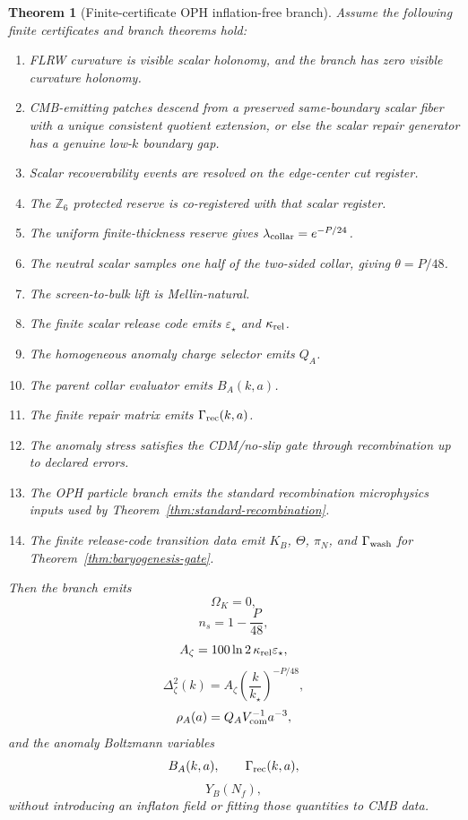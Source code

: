 \documentclass[11pt]{article}
\newtheorem{theorem}{Theorem}[section]
\newcommand{\Zsix}{\mathbb Z_6}
\begin{document}
\begin{theorem}[Finite-certificate OPH inflation-free branch]\label{thm:finite-certificate-branch}
Assume the following finite certificates and branch theorems hold:
\begin{enumerate}[leftmargin=2em]
\item FLRW curvature is visible scalar holonomy, and the branch has zero visible curvature holonomy.
\item CMB-emitting patches descend from a preserved same-boundary scalar fiber with a unique
consistent quotient extension, or else the scalar repair generator has a genuine low-\(k\) boundary
gap.
\item Scalar recoverability events are resolved on the edge-center cut register.
\item The \(\Zsix\) protected reserve is co-registered with that scalar register.
\item The uniform finite-thickness reserve gives \(\lambda_{\rm collar}=e^{-P/24}\).
\item The neutral scalar samples one half of the two-sided collar, giving \(\theta=P/48\).
\item The screen-to-bulk lift is Mellin-natural.
\item The finite scalar release code emits \(\varepsilon_\star\) and \(\kappa_{\rm rel}\).
\item The homogeneous anomaly charge selector emits \(Q_A\).
\item The parent collar evaluator emits \(B_A(k,a)\).
\item The finite repair matrix emits \(\Gamma_{\rm rec}(k,a)\).
\item The anomaly stress satisfies the CDM/no-slip gate through recombination up to declared errors.
\item The OPH particle branch emits the standard recombination microphysics inputs used by
Theorem~\ref{thm:standard-recombination}.
\item The finite release-code transition data emit \(K_B\), \(\Theta\), \(\pi_N\), and
\(\Gamma_{\rm wash}\) for Theorem~\ref{thm:baryogenesis-gate}.
\end{enumerate}
Then the branch emits
\[
\Omega_K=0,
\]
\[
n_s=1-\frac{P}{48},
\]
\[
A_\zeta
=
100\ln2\,\kappa_{\rm rel}\varepsilon_\star,
\]
\[
\Delta_\zeta^2(k)
=
A_\zeta
\left(\frac{k}{k_\star}\right)^{-P/48},
\]
\[
\rho_A(a)=Q_AV_{\rm com}^{-1}a^{-3},
\]
and the anomaly Boltzmann variables
\[
B_A(k,a),\qquad
\Gamma_{\rm rec}(k,a),
\]
\[
Y_B(N_f),
\]
without introducing an inflaton field or fitting those quantities to CMB data.
\end{theorem}
\end{document}
